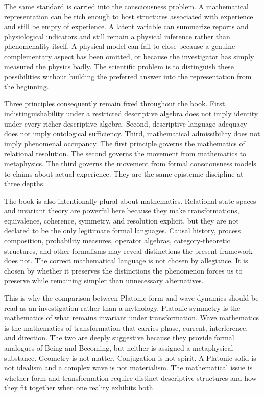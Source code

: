 The same standard is carried into the consciousness problem. A mathematical representation can be rich enough to host structures associated with experience and still be empty of experience. A latent variable can summarize reports and physiological indicators and still remain a physical inference rather than phenomenality itself. A physical model can fail to close because a genuine complementary aspect has been omitted, or because the investigator has simply measured the physics badly. The scientific problem is to distinguish these possibilities without building the preferred answer into the representation from the beginning.

Three principles consequently remain fixed throughout the book. First, indistinguishability under a restricted descriptive algebra does not imply identity under every richer descriptive algebra. Second, descriptive-language adequacy does not imply ontological sufficiency. Third, mathematical admissibility does not imply phenomenal occupancy. The first principle governs the mathematics of relational resolution. The second governs the movement from mathematics to metaphysics. The third governs the movement from formal consciousness models to claims about actual experience. They are the same epistemic discipline at three depths.

The book is also intentionally plural about mathematics. Relational state spaces and invariant theory are powerful here because they make transformations, equivalence, coherence, symmetry, and resolution explicit, but they are not declared to be the only legitimate formal languages. Causal history, process composition, probability measures, operator algebras, category-theoretic structures, and other formalisms may reveal distinctions the present framework does not. The correct mathematical language is not chosen by allegiance. It is chosen by whether it preserves the distinctions the phenomenon forces us to preserve while remaining simpler than unnecessary alternatives.

This is why the comparison between Platonic form and wave dynamics should be read as an investigation rather than a mythology. Platonic symmetry is the mathematics of what remains invariant under transformation. Wave mathematics is the mathematics of transformation that carries phase, current, interference, and direction. The two are deeply suggestive because they provide formal analogues of Being and Becoming, but neither is assigned a metaphysical substance. Geometry is not matter. Conjugation is not spirit. A Platonic solid is not idealism and a complex wave is not materialism. The mathematical issue is whether form and transformation require distinct descriptive structures and how they fit together when one reality exhibits both.

